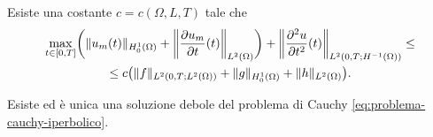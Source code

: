 \begin{teorema} \label{t:stima-energia-iperboliche}
    Esiste una costante $c=c(\Omega,L,T)$ tale che
    \begin{multline}
        \max_{t\in[0,T]}\biggl(\norm{u_m(t)}_{\sobHc[1]{\Omega}}+\norm[\bigg]{\drp{u_m}{t}(t)}_{\leb[2]{\Omega}}\biggr)+\norm[\bigg]{\ddrp{u}{t}(t)}_{\leb[2]{0,T;\sobH[-1]{\Omega}}}\le\\ \le
        c\bigl(\norm{f}_{\leb[2]{0,T;\leb[2]{\Omega}}}+\norm{g}_{\sobHc[1]{\Omega}}+\norm{h}_{\leb[2]{\Omega}}\bigr).
        \label{eq:stima-energia-iperboliche}
    \end{multline}
\end{teorema}
\begin{teorema} \label{t:esistenza-unicita-iperboliche}
    Esiste ed è unica una soluzione debole del problema di Cauchy \eqref{eq:problema-cauchy-iperbolico}.
\end{teorema}
